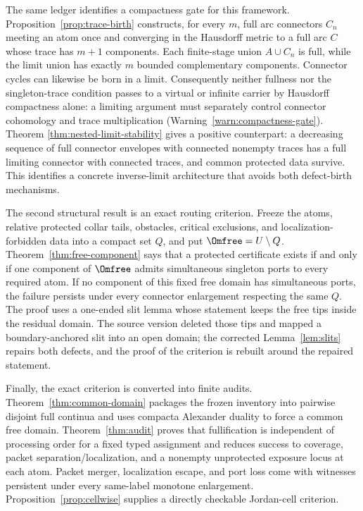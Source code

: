 The same ledger identifies a compactness gate for this framework.
Proposition~\ref{prop:trace-birth} constructs, for every $m$, full arc
connectors $C_n$ meeting an atom once and converging in the Hausdorff metric
to a full arc $C$ whose trace has $m+1$ components.  Each finite-stage
union $A\cup C_n$ is full, while the
limit union has exactly $m$ bounded complementary components.
Connector cycles can likewise be born in a limit.  Consequently neither
fullness nor the singleton-trace condition passes to a virtual or infinite
carrier by Hausdorff compactness alone: a limiting argument must separately
control connector cohomology and trace multiplication
(Warning~\ref{warn:compactness-gate}).  Theorem
\ref{thm:nested-limit-stability} gives a positive counterpart: a decreasing
sequence of full connector envelopes with connected nonempty traces has a
full limiting connector with connected traces, and common protected data
survive.  This identifies a concrete inverse-limit architecture that avoids
both defect-birth mechanisms.

The second structural result is an exact routing criterion.  Freeze the
atoms, relative protected collar tails, obstacles, critical exclusions, and
localization-forbidden data into a compact set $Q$, and put
$\Omfree=U\setminus Q$.  Theorem~\ref{thm:free-component} says that a
protected certificate exists if and only if one component of $\Omfree$
admits simultaneous singleton ports to every required atom.  If no
component of this fixed free domain has simultaneous ports, the failure
persists under every connector enlargement respecting the same $Q$.  The
proof uses a one-ended slit lemma whose statement keeps
the free tips inside the residual domain.  The source version deleted those
tips and mapped a boundary-anchored slit into an open domain; the corrected
Lemma~\ref{lem:slits} repairs both defects, and the proof of the criterion is
rebuilt around the repaired statement.

Finally, the exact criterion is converted into finite audits.
Theorem~\ref{thm:common-domain} packages the frozen inventory into pairwise
disjoint full continua and uses compacta Alexander duality to force a common
free domain.  Theorem~\ref{thm:audit} proves that fullification is independent
of processing order for a fixed typed assignment and reduces success to
coverage, packet separation/localization, and a nonempty unprotected
exposure locus at each atom.  Packet merger, localization escape, and port
loss come with witnesses persistent under every same-label monotone
enlargement.  Proposition~\ref{prop:cellwise} supplies a directly checkable
Jordan-cell criterion.

